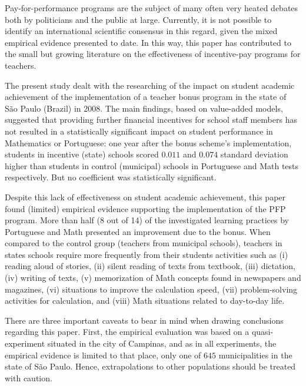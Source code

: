 \documentclass[a4paper, 12pt]{article}
\begin{document}
Pay-for-performance programs are the subject of many often very heated debates \textemdash both by politicians and the public at large. Currently, it is not possible to identify an international scientific consensus in this regard, given the mixed empirical evidence presented to date. In this way, this paper has contributed to the small but growing literature on the effectiveness of incentive-pay programs for teachers.


The present study dealt with the researching of the impact on student academic achievement of the implementation of a teacher bonus program in the state of São Paulo (Brazil) in 2008. The main findings, based on value-added models, suggested that providing further financial incentives for school staff members has not resulted in a statistically significant impact on student performance in Mathematics or Portuguese: one year after the bonus scheme’s implementation, students in incentive (state) schools scored $0.011$ and $0.074$ standard deviation higher than students in control (municipal) schools in Portuguese and Math tests respectively. But no coefficient was statistically significant. 


Despite this lack of effectiveness on student academic achievement, this paper found (limited) empirical evidence supporting the implementation of the PFP program. More than half (8 out of 14) of the investigated learning practices by Portuguese and Math presented an improvement due to the bonus. When compared to the control group (teachers from municipal schools), teachers in states schools require more frequently from their students activities such as (i) reading aloud of stories, (ii) silent reading of texts from textbook, (iii) dictation, (iv) writing of texts, (v) memorization of Math concepts found in newspapers and magazines, (vi) situations to improve the calculation speed, (vii) problem-solving activities for calculation, and (viii) Math situations related to day-to-day life.


There are three important caveats to bear in mind when drawing conclusions regarding this paper. First, the empirical evaluation was based on a quasi-experiment situated in the city of Campinas, and as in all experiments, the empirical evidence is limited to that place, only one of $645$ municipalities in the state of São Paulo. Hence, extrapolations to other populations should be treated with caution. 
\end{document}
